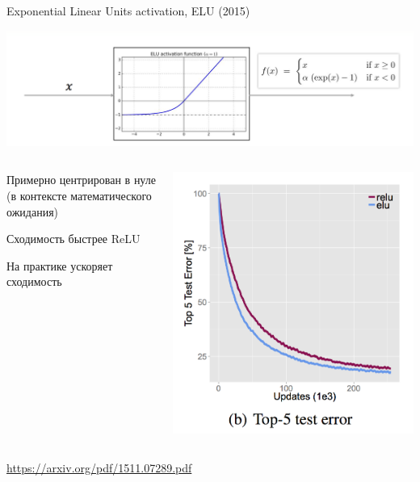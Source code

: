 \documentclass[notes,12pt, aspectratio=169]{beamer}
\begin{document}
\begin{frame}{Exponential Linear Units activation, ELU (2015)}
	\begin{center}
		\includegraphics[width=.8\linewidth]{elu.png}
	\end{center}
	\begin{columns}
		\begin{column}{0.7\textwidth}
			\begin{itemize}
				{ \color{green} 
					\item  Примерно центрирован в нуле (в контексте математического ожидания)
					\item  Сходимость быстрее ReLU
					\item  На практике ускоряет сходимость} 
			\end{itemize}
		\end{column}
		\hfill
		\begin{column}{0.4\textwidth}
			\includegraphics[width=.55\linewidth]{elu_loss.png}
		\end{column}
	\end{columns}
\vfill %
\footnotesize
{\color{blue} \url{https://arxiv.org/pdf/1511.07289.pdf}}
\end{frame}
\end{document}
